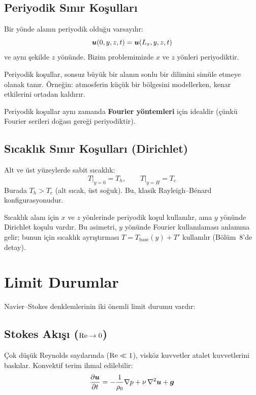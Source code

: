 \subsection{Periyodik Sınır Koşulları}
Bir yönde alanın periyodik olduğu varsayılır:
\begin{equation}
    \bm{u}(0, y, z, t) = \bm{u}(L_x, y, z, t)
    \label{eq:periodic_bc}
\end{equation}
ve aynı şekilde $z$ yönünde. Bizim problemimizde $x$ ve $z$ yönleri periyodiktir.

Periyodik koşullar, sonsuz büyük bir alanın sonlu bir dilimini simüle etmeye olanak tanır. Örneğin: atmosferin küçük bir bölgesini modellerken, kenar etkilerini ortadan kaldırır.

Periyodik koşullar aynı zamanda \textbf{Fourier yöntemleri} için idealdir (çünkü Fourier serileri doğası gereği periyodiktir).

\subsection{Sıcaklık Sınır Koşulları (Dirichlet)}
Alt ve üst yüzeylerde sabit sıcaklık:
\begin{equation}
    T\big|_{y=0} = T_h, \qquad T\big|_{y=H} = T_c
    \label{eq:temp_bc}
\end{equation}
Burada $T_h > T_c$ (alt sıcak, üst soğuk). Bu, klasik Rayleigh--B\'{e}nard konfigurasyonudur.

\begin{remark}
Sıcaklık alanı için $x$ ve $z$ yönlerinde periyodik koşul kullanılır, ama $y$ yönünde Dirichlet koşulu vardır. Bu asimetri, $y$ yönünde Fourier kullanılaması anlamına gelir; bunun için sıcaklık ayrıştırması $T = T_{\text{base}}(y) + T'$ kullanılır (Bölüm~8'de detay).
\end{remark}


\section{Limit Durumlar}
\label{sec:limitler}

Navier--Stokes denklemlerinin iki önemli limit durumu vardır:

\subsection{Stokes Akışı ($\mathrm{Re} \to 0$)}

Çok düşük Reynolds sayılarında ($\mathrm{Re} \ll 1$), visköz kuvvetler atalet kuvvetlerini baskılar. Konvektif terim ihmal edilebilir:
\begin{equation}
    \frac{\partial \bm{u}}{\partial t} = -\frac{1}{\rho_0}\nabla p + \nu\,\nabla^2\bm{u} + \bm{g}
    \label{eq:stokes}
\end{equation}

